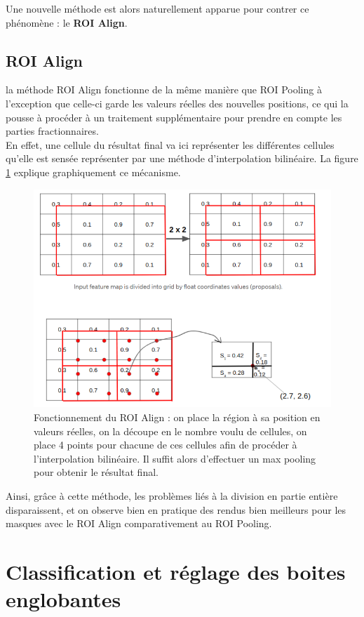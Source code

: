 Une nouvelle méthode est alors naturellement apparue pour contrer ce phénomène : le \textbf{ROI Align}.

\subsection{ROI Align}

la méthode ROI Align fonctionne de la même manière que ROI Pooling à l'exception que celle-ci garde les valeurs réelles des nouvelles positions, ce qui la pousse à procéder à un traitement supplémentaire pour prendre en compte les parties fractionnaires.\\
En effet, une cellule du résultat final va ici représenter les différentes cellules qu'elle est sensée représenter par une méthode d'interpolation bilinéaire. La figure \ref{ROI_Align} explique graphiquement ce mécanisme.

\begin{figure}[!h]
\centering
\includegraphics[width=200pts]{images/Mask_R_CNN/ROI_Align.png} 
\caption{Fonctionnement du ROI Align : on place la région à sa position en valeurs réelles, on la découpe en le nombre voulu de cellules, on place 4 points pour chacune de ces cellules afin de procéder à l'interpolation bilinéaire. Il suffit alors d'effectuer un max pooling pour obtenir le résultat final.}
\label{ROI_Align}
\end{figure}

Ainsi, grâce à cette méthode, les problèmes liés à la division en partie entière disparaissent, et on observe bien en pratique des rendus bien meilleurs pour les masques avec le ROI Align comparativement au ROI Pooling.

\section{Classification et réglage des boites englobantes}

